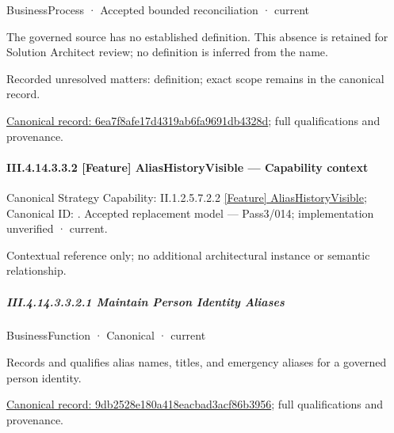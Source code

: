 \label{element:6ea7f8afe17d4319ab6fa9691db4328d}
{\small BusinessProcess · Accepted bounded reconciliation · current}\par

The governed source has no established definition. This absence is retained for Solution Architect review; no definition is inferred from the name.


{\small Recorded unresolved matters: definition; exact scope remains in the canonical record.}\par
{\footnotesize \href{../../../../../../../../continuum/business/business-process/6ea7f8afe17d4319ab6fa9691db4328d.md}{Canonical record: 6ea7f8afe17d4319ab6fa9691db4328d}; full qualifications and provenance.}\par
\paragraph*{III.4.14.3.3.2 [Feature] AliasHistoryVisible — Capability context}
\label{navigation:III.4.14.3.3.2}

{\small Canonical Strategy Capability: II.1.2.5.7.2.2 \hyperref[element:5d8ab81e7a9748e9ac611b3c207eef38]{[Feature] AliasHistoryVisible}; Canonical ID: \texttt{}. Accepted replacement model — Pass3/014; implementation unverified · current.}\par
Contextual reference only; no additional architectural instance or semantic relationship.\par
\subparagraph*{III.4.14.3.3.2.1 Maintain Person Identity Aliases}
\label{navigation:III.4.14.3.3.2.1}

\label{element:9db2528e180a418eacbad3acf86b3956}
{\small BusinessFunction · Canonical · current}\par

Records and qualifies alias names, titles, and emergency aliases for a governed person identity.


{\footnotesize \href{../../../../../../../../continuum/business/business-function/9db2528e180a418eacbad3acf86b3956.md}{Canonical record: 9db2528e180a418eacbad3acf86b3956}; full qualifications and provenance.}\par
